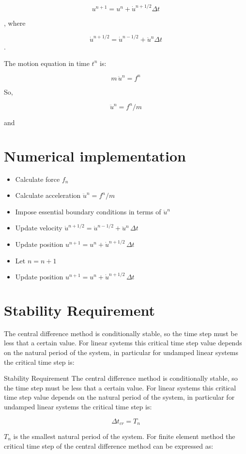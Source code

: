 \documentclass[11pt,a4paper]{article}
\begin{document}
$$ u^{n+1} = u^{n} + \dot u ^ {n+1/2} \Delta t $$

, where

$$ \dot u^{n+1/2} = \dot{ u } ^ {n-1/2} + \ddot u ^ {n}  \Delta t $$.

The motion equation in time $ t^{n} $ is:

$$ m \, \ddot u ^{n} = f ^{n} $$

So,

$$ \ddot u ^{n} = f ^{n} / m $$

and
\section{Numerical implementation}
\begin{itemize}

\item Calculate force  $ f_n  $
\item Calculate acceleration  $ \ddot u ^{n} = f ^{n} / m  $
\item Impose essential boundary conditions in terms of  $ \ddot u ^{n}  $
\item Update velocity  $ \dot u ^ {n+1/2} = \dot u ^ {n-1/2} + \ddot u ^{n} \, \Delta t  $
\item Update position  $ u^{n+1} = u^{n} + \dot u ^ {n+1/2} \, \Delta t  $
\item Let  $ n = n + 1  $
\item Update position  $ u^{n+1} = u^{n} + \dot u ^ {n+1/2} \, \Delta t  $
\end{itemize}

\section{Stability Requirement}
The central difference method is conditionally stable, so the time step must be less that a certain value. For linear systems this critical time step value depends on the natural period of the system, in particular for undamped linear systems the critical time step is:

Stability Requirement
The central difference method is conditionally stable, so the time step must be less that a certain value. For linear systems this critical time step value depends on the natural period of the system, in particular for undamped linear systems the critical time step is:

$$ \Delta t_{cr} = T_n $$

 $ T_n  $ is the smallest natural period of the system. For finite element method the critical time step of the central difference method can be expressed as:
\end{document}
